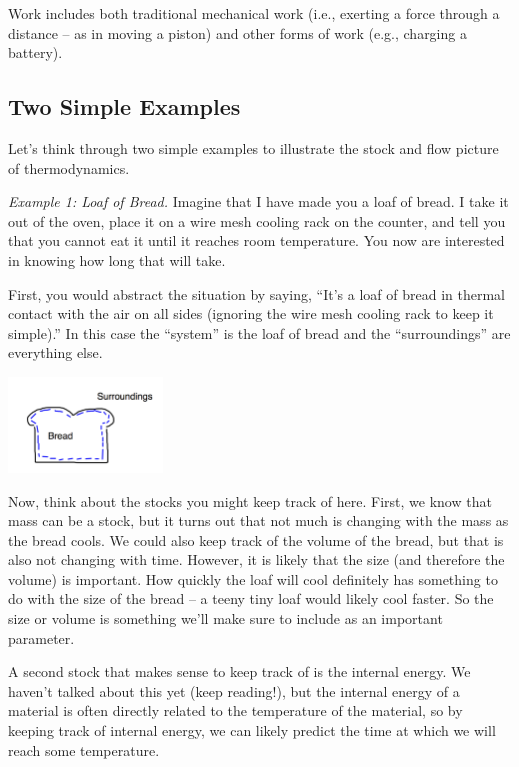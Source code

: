 Work includes both traditional mechanical work (i.e., exerting a force through a distance -- as in moving a piston) and other forms of work (e.g., charging a battery).

\subsection{Two Simple Examples}

Let's think through two simple examples to illustrate the stock and flow picture of thermodynamics.

{\it Example 1: Loaf of Bread.} Imagine that I have made you a loaf of bread. I take it out of the oven, place it on a wire mesh cooling rack on the counter, and tell you that you cannot eat it until it reaches room temperature. You now are interested in knowing how long that will take.

First, you would abstract the situation by saying, ``It's a loaf of bread in thermal contact with the air on all sides (ignoring the wire mesh cooling rack to keep it simple).'' In this case the ``system'' is the loaf of bread and the ``surroundings'' are everything else. 

\beforefig
\centerline{\includegraphics[height=1in]{figs/bread.png}}
\afterfig

Now, think about the stocks you might keep track of here. First, we know that mass can be a stock, but it turns out that not much is changing with the mass as the bread cools. We could also keep track of the volume of the bread, but that is also not changing with time. However, it is likely that the size (and therefore the volume) is important. How quickly the loaf will cool definitely has something to do with the size of the bread -- a teeny tiny loaf would likely cool faster. So the size or volume is something we'll make sure to include as an important parameter.

A second stock that makes sense to keep track of is the internal energy. We haven't talked about this yet (keep reading!), but the internal energy of a material is often directly related to the temperature of the material, so by keeping track of internal energy, we can likely predict the time at which we will reach some temperature.

